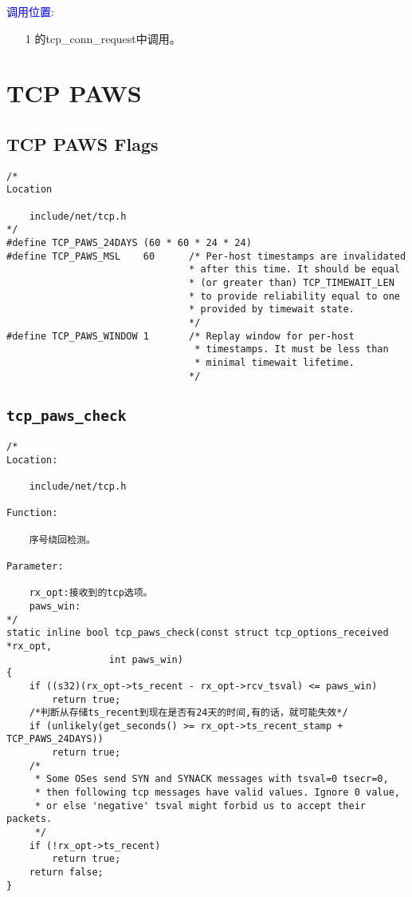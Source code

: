         \textcolor{blue}{调用位置}:
            \begin{enumerate}
                \item[1]        \label{Server:tcp_conn_request}的tcp\_conn\_request中调用。
            \end{enumerate}

\section{TCP PAWS}
    \subsection{TCP PAWS Flags}
\begin{verbatim}
/*
Location

    include/net/tcp.h
*/
#define TCP_PAWS_24DAYS (60 * 60 * 24 * 24)
#define TCP_PAWS_MSL    60      /* Per-host timestamps are invalidated
                                * after this time. It should be equal
                                * (or greater than) TCP_TIMEWAIT_LEN
                                * to provide reliability equal to one
                                * provided by timewait state.
                                */
#define TCP_PAWS_WINDOW 1       /* Replay window for per-host
                                 * timestamps. It must be less than
                                 * minimal timewait lifetime.
                                */
\end{verbatim}

    \subsection{\texttt{tcp_paws_check}}

\begin{verbatim}
/*
Location:

    include/net/tcp.h

Function:

    序号绕回检测。

Parameter:
    
    rx_opt:接收到的tcp选项。
    paws_win:
*/
static inline bool tcp_paws_check(const struct tcp_options_received *rx_opt,
                  int paws_win)
{
    if ((s32)(rx_opt->ts_recent - rx_opt->rcv_tsval) <= paws_win)
        return true;
    /*判断从存储ts_recent到现在是否有24天的时间,有的话，就可能失效*/
    if (unlikely(get_seconds() >= rx_opt->ts_recent_stamp + TCP_PAWS_24DAYS))
        return true;
    /*
     * Some OSes send SYN and SYNACK messages with tsval=0 tsecr=0,
     * then following tcp messages have valid values. Ignore 0 value,
     * or else 'negative' tsval might forbid us to accept their packets.
     */
    if (!rx_opt->ts_recent)
        return true;
    return false;
}
\end{verbatim}


